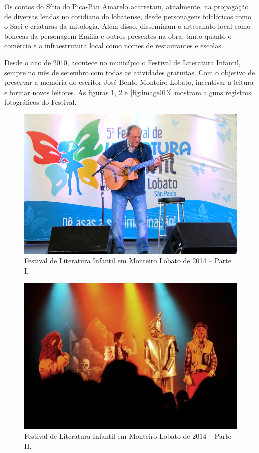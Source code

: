 Os contos do Sítio do Pica-Pau Amarelo acarretam, atualmente, na propagação de diversas lendas no cotidiano do lobatense, desde personagens folclóricos como o Saci e criaturas da mitologia. Além disso, disseminam o artesanato local como bonecas da personagem Emília e outros presentes na obra; tanto quanto o comércio e a infraestrutura local como nomes de restaurantes e escolas.

Desde o ano de 2010, acontece no município o Festival de Literatura Infantil, sempre no mês de setembro com todas as atividades gratuitas. Com o objetivo de preservar a memória do escritor José Bento Monteiro Lobato, incentivar a leitura e formar novos leitores. As figuras \ref{fig:image011}, \ref{fig:image012} e \ref{fig:image013} mostram alguns registros fotográficos do Festival.

 \begin{figure}[h!]
 	\centering
 	\includegraphics[width=0.75\linewidth]{produtos/proddois/image011}
 	\caption{Festival de Literatura Infantil em Monteiro Lobato de 2014 – Parte I.}
 	\label{fig:image011}
 \end{figure}

 \begin{figure}[h!]
 	\centering
 	\includegraphics[width=0.75\linewidth]{produtos/proddois/image012}
 	\caption{Festival de Literatura Infantil em Monteiro Lobato de 2014 – Parte II.}
 	\label{fig:image012}
 \end{figure}

